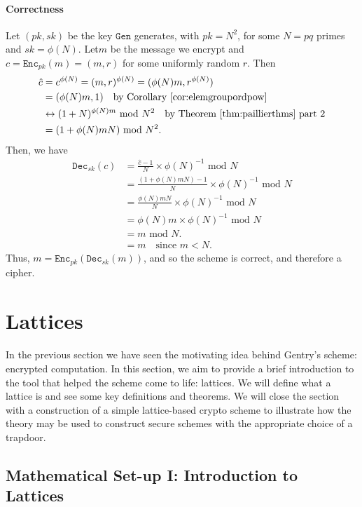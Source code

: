 \documentclass{article}
\theoremstyle{definition}
\newcommand{\Enc}{\texttt{Enc}}
\newcommand{\Dec}{\texttt{Dec}}
\newcommand{\Gen}{\texttt{Gen}}
\renewcommand{\mod}{\,\,\text{mod}\,\,}
\begin{document}
\paragraph{Correctness}
Let $(pk, sk)$ be the key $\Gen$ generates, with $pk = N^2$, for some $N = pq$
primes and $sk = \phi(N)$. Let$m$ be the message we encrypt and $c =
\Enc_{pk}(m) =(m, r)$ for some uniformly random $r$. Then
\begin{align*}
  \hat{c} &= c^{\phi(N)} = (m, r)^{\phi(N)} = (\phi(N)m, r^{\phi(N)}) \\
          &= (\phi(N)m, 1) \quad \text{by Corollary \ref{cor:elemgroupordpow}}\\
          &\leftrightarrow (1 + N)^{\phi(N)m} \mod N^2 \quad \text{by Theorem \ref{thm:paillierthms} part 2}\\
          &= (1 + \phi(N)mN) \mod N^2.
\end{align*}
Then, we have
\begin{align*}
  \Dec_{sk}(c) &= \frac{\hat{c} - 1}{N} \times \phi(N)^{-1} \mod N\\
               &= \frac{(1 + \phi(N)mN) - 1}{N} \times \phi(N)^{-1} \mod N\\
               &= \frac{\phi(N)mN}{N}\times \phi(N)^{-1} \mod N\\
               &= \phi(N)m \times \phi(N)^{-1} \mod N \\
               &= m \mod N. \\
               &= m \quad \text{since } m < N.
\end{align*}
Thus, $m = \Enc_{pk}(\Dec_{sk}(m))$, and so the scheme is correct, and therefore
a cipher.
\section{Lattices}
\paragraph{}
In the previous section we have seen the motivating idea behind Gentry's scheme:
encrypted computation. In this section, we aim to provide a brief introduction
to the tool that helped the scheme come to life: lattices. We will define what a
lattice is and see some key definitions and theorems. We will close the section
with a construction of a simple lattice-based crypto scheme to illustrate how
the theory may be used to construct secure schemes with the appropriate choice
of a trapdoor.
\subsection{Mathematical Set-up I: Introduction to Lattices}
\end{document}
